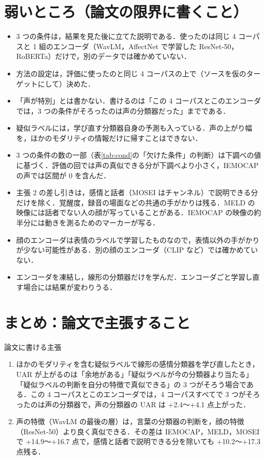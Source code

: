\documentclass[a4paper,11pt]{ltjsarticle}
\begin{document}
\section{弱いところ（論文の限界に書くこと）}

\begin{itemize}
  \item 3 つの条件は，結果を見た後に立てた説明である．使ったのは同じ 4 コーパスと 1 組のエンコーダ（WavLM，AffectNet で学習した ResNet-50，RoBERTa）だけで，別のデータでは確かめていない．
  \item 方法の設定は，評価に使ったのと同じ 4 コーパスの上で（ソースを仮のターゲットにして）決めた．
  \item 「声が特別」とは書かない．書けるのは「この 4 コーパスとこのエンコーダでは，3 つの条件がそろったのは声の分類器だった」までである．
  \item 疑似ラベルには，学び直す分類器自身の予測も入っている．声の上がり幅を，ほかのモダリティの情報だけに帰すことはできない．
  \item 3 つの条件の数の一部（表\ref{tab:cond}の「欠けた条件」の判断）は下調べの値に基づく．評価の回では声の真似できる分が下調べより小さく，IEMOCAP の声では区間が 0 を含んだ．
  \item 主張 2 の差し引きは，感情と話者（MOSEI はチャンネル）で説明できる分だけを除く．覚醒度，録音の場面などの共通の手がかりは残る．MELD の映像には話者でない人の顔が写っていることがある．IEMOCAP の映像の約半分には動きを測るためのマーカーが写る．
  \item 顔のエンコーダは表情のラベルで学習したものなので，表情以外の手がかりが少ない可能性がある．別の顔のエンコーダ（CLIP など）では確かめていない．
  \item エンコーダを凍結し，線形の分類器だけを学んだ．エンコーダごと学習し直す場合には結果が変わりうる．
\end{itemize}

\section{まとめ：論文で主張すること}

\begin{yoten}{論文に書ける主張}
\begin{enumerate}
  \item ほかのモダリティを含む疑似ラベルで線形の感情分類器を学び直したとき，UAR が上がるのは「余地がある」「疑似ラベルが今の分類器より当たる」「疑似ラベルの判断を自分の特徴で真似できる」の 3 つがそろう場合である．この 4 コーパスとこのエンコーダでは，4 コーパスすべてで 3 つがそろったのは声の分類器で，声の分類器の UAR は +2.4〜+4.1 点上がった．
  \item 声の特徴（WavLM の最後の層）は，言葉の分類器の判断を，顔の特徴（ResNet-50）より良く真似できる．その差は IEMOCAP，MELD，MOSEI で +14.9〜+16.7 点で，感情と話者で説明できる分を除いても +10.2〜+17.3 点残る．
\end{enumerate}
\end{yoten}
\end{document}
